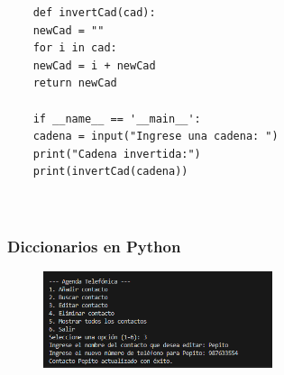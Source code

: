 \documentclass[12pt, a4paper]{article}
\begin{document}
\begin{verbatim}
	def invertCad(cad):
	newCad = ""
	for i in cad:
	newCad = i + newCad
	return newCad
	
	if __name__ == '__main__':
	cadena = input("Ingrese una cadena: ")
	print("Cadena invertida:")
	print(invertCad(cadena))
	
	
\end{verbatim}
\vspace{0.5cm}

\subsubsection*{Diccionarios en Python}

\begin{figure}[ht]
	\centering
	\includegraphics[width=0.6\textwidth]{images/diccionarios_python.png}
	\label{fig:diccionarios_python}
\end{figure}
\end{document}
